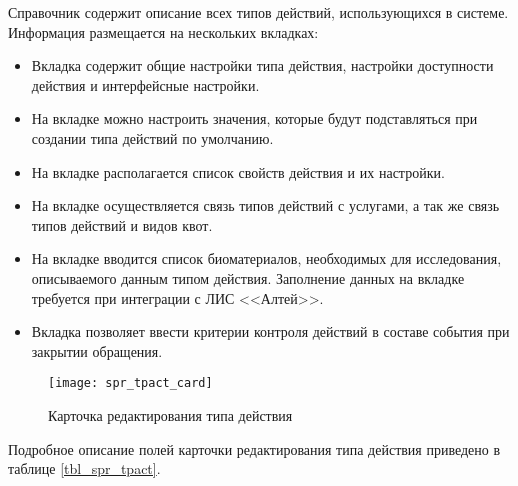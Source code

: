 Справочник содержит описание всех типов действий, использующихся в системе. Информация размещается на нескольких вкладках:
\begin{itemize}
 \item Вкладка  содержит общие настройки типа действия, настройки доступности действия и интерфейсные настройки.
 \item На вкладке  можно настроить значения, которые будут подставляться при создании типа действий по умолчанию.
 \item На вкладке  располагается список свойств действия и их настройки.
 \item На вкладке  осуществляется связь типов действий с услугами, а так же связь типов действий и видов квот.
 \item На вкладке  вводится список биоматериалов, необходимых для исследования, описываемого данным типом действия. Заполнение данных на вкладке требуется при интеграции с ЛИС <<Алтей>>.
 \item Вкладка  позволяет ввести критерии контроля действий в составе события при закрытии обращения.
\end{itemize}

\begin{figure}[ht!]\centering
 \texttt{[image: spr\_tpact\_card]}
 \caption{Карточка редактирования типа действия}
 \label{img_spr_tpact_card}
\end{figure}

Подробное описание полей карточки редактирования типа действия приведено в таблице \ref{tbl_spr_tpact}.

